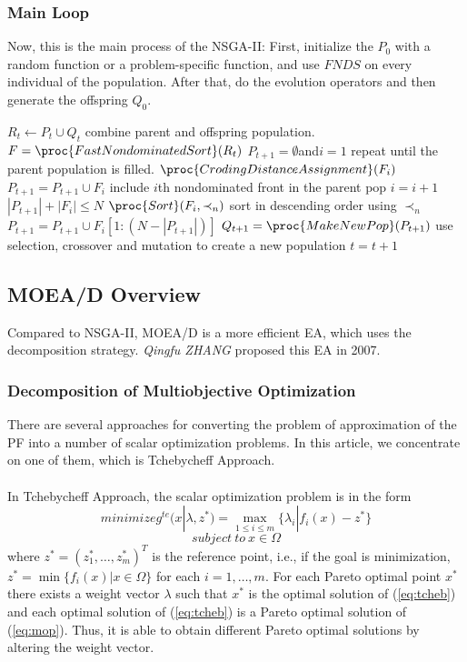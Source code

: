 \documentclass[a4paper, 11pt]{article}
\begin{document}
\subsubsection{Main Loop}
Now, this is the main process of the NSGA-II:
First, initialize the $P_0$ with a random function or a problem-specific function, and use $FNDS$ on every individual of the population. After that, do the evolution operators and then generate the offspring $Q_0$.
\begin{codebox}
\li $R_t \gets P_t \cup Q_t$ \Comment combine parent and offspring population.
\li $F=\proc{FastNondominatedSort}(R_t)$
\li $P_{t+1}=\emptyset$and$i=1$
\li \Repeat \Comment repeat until the parent population is filled.
\li     $\proc{CrodingDistanceAssignment}(F_i)$
\li     $P_{t+1}=P_{t+1}\cup F_i$
\li     \Comment include $i$th nondominated front in the parent pop
\li     $i=i+1$
\li \Until $|P_{t+1}|+|F_i|\le N$
\li $\proc{Sort}(F_i,\prec_n)$ \Comment sort in descending order using $\prec_n$
\li $P_{t+1}=P_{t+1}\cup F_i[1:(N-|P_{t+1}|)]$
\li $Q_{t+1}=\proc{MakeNewPop}(P_{t+1})$
\li \Comment use selection, crossover and mutation to create a new population
\li $t=t+1$
\end{codebox}

\subsection{MOEA/D Overview}
Compared to NSGA-II, MOEA/D is a more efficient EA, which uses the decomposition strategy. \emph{Qingfu ZHANG} proposed this EA in 2007.

\subsubsection{Decomposition of Multiobjective Optimization}
There are several approaches for converting the problem of approximation of the PF into a number of scalar optimization problems.
In this article, we concentrate on one of them, which is Tchebycheff Approach\cite{miettinen1999nonlinear}.\\
\\
In Tchebycheff Approach, the scalar optimization problem is in the form
\begin{displaymath}
minimize g^{te}(x|\lambda, z^\ast)=\max_{1\le i\le m}\{\lambda_i|f_i(x)-z^\ast\}
\end{displaymath}
\begin{equation} \label{eq:tcheb}
subject\ to\ x\in\Omega
\end{equation}
where $z^\ast=(z^\ast_1,\ldots,z^\ast_m)^T$ is the reference point, i.e., if the goal is minimization, $z^\ast=\min\{f_i(x)|x\in\Omega\}$ for each $i=1,\ldots,m$.
For each Pareto optimal point $x^\ast$ there exists a weight vector $\lambda$ such that $x^\ast$ is the optimal solution of (\ref{eq:tcheb})
and each optimal solution of (\ref{eq:tcheb}) is a Pareto optimal solution of (\ref{eq:mop}). Thus, it is able to obtain different Pareto optimal solutions by altering the weight vector.
\end{document}
